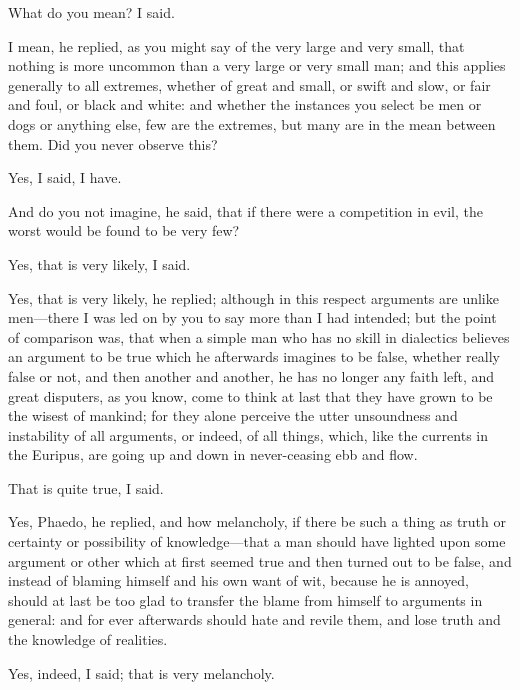 What do you mean? I said.

I mean, he replied, as you might say of the very large and very small,
that nothing is more uncommon than a very large or very small man; and
this applies generally to all extremes, whether of great and small, or
swift and slow, or fair and foul, or black and white: and whether the
instances you select be men or dogs or anything else, few are the
extremes, but many are in the mean between them. Did you never observe
this?

Yes, I said, I have.

And do you not imagine, he said, that if there were a competition in evil,
the worst would be found to be very few?

Yes, that is very likely, I said.

Yes, that is very likely, he replied; although in this respect arguments
are unlike men—there I was led on by you to say more than I had
intended; but the point of comparison was, that when a simple man who has
no skill in dialectics believes an argument to be true which he afterwards
imagines to be false, whether really false or not, and then another and
another, he has no longer any faith left, and great disputers, as you
know, come to think at last that they have grown to be the wisest of
mankind; for they alone perceive the utter unsoundness and instability of
all arguments, or indeed, of all things, which, like the currents in the
Euripus, are going up and down in never-ceasing ebb and flow.

That is quite true, I said.

Yes, Phaedo, he replied, and how melancholy, if there be such a thing as
truth or certainty or possibility of knowledge—that a man should
have lighted upon some argument or other which at first seemed true and
then turned out to be false, and instead of blaming himself and his own
want of wit, because he is annoyed, should at last be too glad to transfer
the blame from himself to arguments in general: and for ever afterwards
should hate and revile them, and lose truth and the knowledge of
realities.

Yes, indeed, I said; that is very melancholy.


